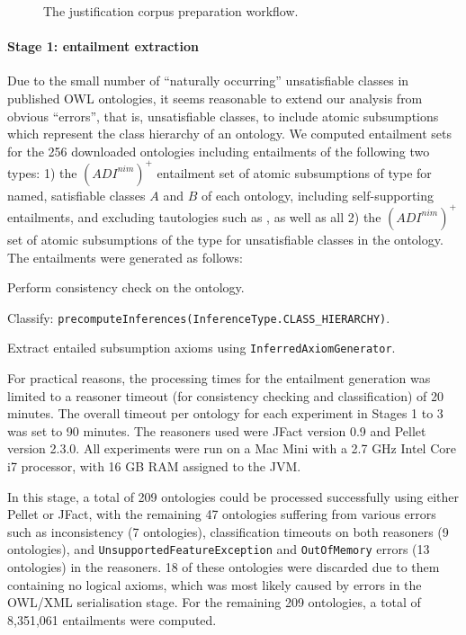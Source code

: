 \begin{figure}
\centering

\caption{The justification corpus preparation workflow.}
\label{fig:workflow}
\end{figure}

\paragraph{Stage 1: entailment extraction}
Due to the small number of \enquote{naturally occurring} unsatisfiable classes in published OWL ontologies, it seems reasonable to extend our analysis from obvious \enquote{errors}, that is,  unsatisfiable classes, to include atomic subsumptions which represent the class hierarchy of an ontology. We computed entailment sets for the 256 downloaded ontologies including entailments of the following two types: 1) the $(ADI^{nim})^{+}$ entailment set of atomic subsumptions of type  for named, satisfiable classes $A$ and $B$ of each ontology, including self-supporting entailments, and excluding tautologies such as , as well as all 2) the $(ADI^{nim})^{+}$ set of atomic subsumptions of the type  for unsatisfiable classes  in the ontology. The entailments were generated as follows:
\begin{compactenum}
\item Perform consistency check on the ontology.
\item Classify: \texttt{precomputeInferences(InferenceType.CLASS\_HIERARCHY)}.
\item Extract entailed subsumption axioms using \texttt{InferredAxiomGenerator}.
\end{compactenum}
For practical reasons, the processing times for the entailment generation was limited to a reasoner timeout (for consistency checking and classification) of 20 minutes. The overall timeout per ontology for each experiment in Stages 1 to 3 was set to 90 minutes. The reasoners used were JFact version 0.9 and Pellet version 2.3.0. All experiments were run on a Mac Mini with a 2.7 GHz Intel Core i7 processor, with 16 GB RAM assigned to the JVM.

In this stage, a total of 209 ontologies could be processed successfully using either Pellet or JFact, with the remaining 47 ontologies suffering from various errors such as inconsistency (7 ontologies), classification timeouts on both reasoners (9 ontologies), and \texttt{UnsupportedFeatureException} and \texttt{OutOfMemory} errors (13 ontologies) in the reasoners. 18 of these ontologies were discarded due to them containing no logical axioms, which was most likely caused by errors in the OWL/XML serialisation stage. For the remaining 209 ontologies, a total of 8,351,061 entailments were computed.

